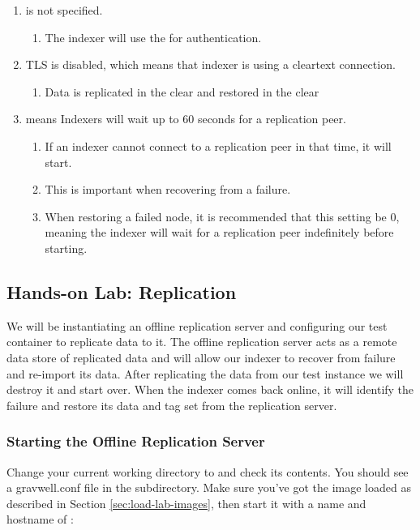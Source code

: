 {\begin{enumerate}
	\item {}is not specified.
	\begin{enumerate}
		\item The indexer will use the  for authentication.
	\end{enumerate}
	\item TLS is disabled, which means that indexer is using a cleartext connection.
	\begin{enumerate}
		\item Data is replicated in the clear and restored in the clear
	\end{enumerate}
	\item {} means Indexers will wait up to 60 seconds for a replication peer.
	\begin{enumerate}
		\item If an indexer cannot connect to a replication peer in that time, it will start.
		\item This is important when recovering from a failure.
		\item When restoring a failed node, it is recommended that this setting be 0, meaning the indexer will wait for a replication peer indefinitely before starting.
	\end{enumerate}
\end{enumerate}

\subsection{Hands-on Lab: Replication}

We will be instantiating an offline replication server and configuring
our test container to replicate data to it. The offline replication
server acts as a remote data store of replicated data and will allow our
indexer to recover from failure and re-import its data. After
replicating the data from our test instance we will destroy it and start
over. When the indexer comes back online, it will identify the failure
and restore its data and tag set from the replication server.

\subsubsection{Starting the Offline Replication Server}

Change your current working directory to  and
check its contents. You should see a gravwell.conf file in the  subdirectory. Make sure you've got the  image loaded as described in Section \ref{sec:load-lab-images}, then start it with a name and hostname of
:

}
